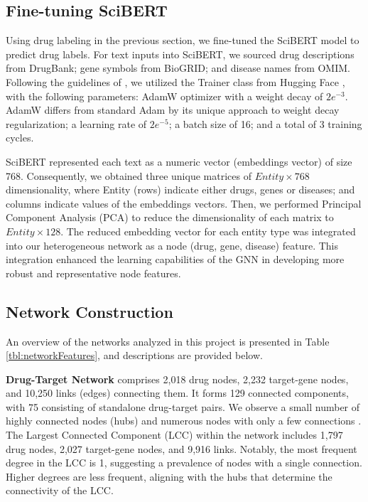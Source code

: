 \documentclass[journal,twoside,web]{ieeecolor}
\begin{document}
\subsection{Fine-tuning SciBERT}
Using drug labeling in the previous section, we fine-tuned the SciBERT model to predict drug labels.
For text inputs into SciBERT, we sourced drug descriptions from DrugBank; gene symbols from BioGRID; and disease names from OMIM.
Following the guidelines of \cite{devlin-etal-2019-bert}, we utilized the Trainer class from Hugging Face \cite{wolf2019huggingface}, with the following parameters:
AdamW optimizer with a weight decay of  $2e^{-3}$.
AdamW differs from standard Adam by its unique approach to weight decay regularization; a learning rate of $2e^{-5}$; a batch size of 16; and a total of 3 training cycles.


SciBERT represented each text as a numeric vector (embeddings vector) of size 768.
Consequently, we obtained three unique matrices of $Entity \times 768$ dimensionality, where Entity (rows) indicate either drugs, genes or diseases; and columns indicate values of the embeddings vectors.
Then, we performed Principal Component Analysis (PCA) to reduce the dimensionality of each matrix to $Entity \times 128$.
The reduced embedding vector for each entity type was integrated into our heterogeneous network as a node (drug, gene, disease) feature.
This integration enhanced the learning capabilities of the GNN in developing more robust and representative node features.


\subsection{Network Construction}
\label{sec:network_construction_2}

An overview of the networks analyzed in this project is presented in Table \ref{tbl:networkFeatures}, and descriptions are provided below.

\textbf{Drug-Target Network}
comprises 2,018 drug nodes, 2,232 target-gene nodes, and 10,250 links (edges) connecting them.
It forms 129 connected components, with 75 consisting of standalone drug-target pairs.
We observe a small number of highly connected nodes (hubs) and numerous nodes with only a few connections \cite{barabasi2009scale}.
The Largest Connected Component (LCC) within the network includes 1,797 drug nodes, 2,027 target-gene nodes, and 9,916 links.
Notably, the most frequent degree in the LCC is 1, suggesting a prevalence of nodes with a single connection.
Higher degrees are less frequent, aligning with the hubs that determine the connectivity of the LCC.
\end{document}
